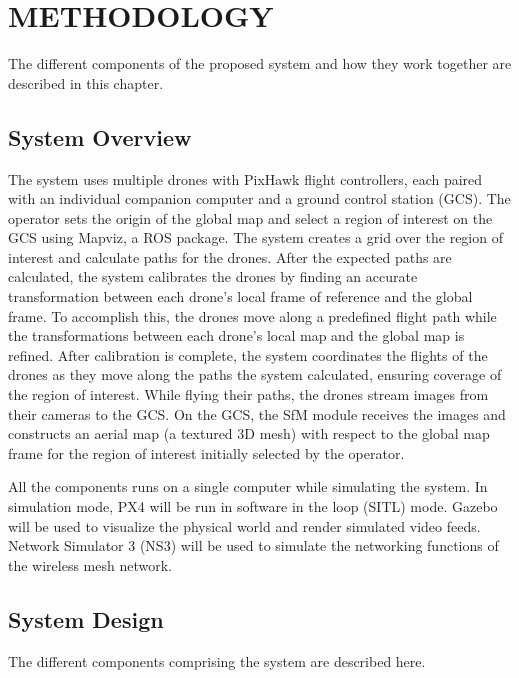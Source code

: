 \setlength{\parindent}{0.5in} 
\setlength{\parskip}{0mm}
\setlength{\baselineskip}{1.6em}

\chapter{METHODOLOGY}
\label{ch:methodology}

The different components of the proposed system and how they work together are described in this chapter.

\section{System Overview}
The system uses multiple drones with PixHawk flight controllers, each paired with an individual companion computer and a ground control station (GCS). The operator sets the origin of the global map and select a region of interest on the GCS using Mapviz, a ROS package. The system creates a grid over the region of interest and calculate paths for the drones. After the expected paths are calculated, the system calibrates the drones by finding an accurate transformation between each drone's local frame of reference and the global frame. To accomplish this, the drones move along a predefined flight path while the transformations between each drone's local map and the global map is refined. After calibration is complete, the system coordinates the flights of the drones as they move along the paths the system calculated, ensuring coverage of the region of interest. While flying their paths, the drones stream images from their cameras to the GCS. On the GCS, the SfM module receives the images and constructs an aerial map (a textured 3D mesh) with respect to the global map frame for the region of interest initially selected by the operator.


All the components runs on a single computer while simulating the system. In simulation mode, PX4 will be run in software in the loop (SITL) mode. Gazebo will be used to visualize the physical world and render simulated video feeds. Network Simulator 3 (NS3) will be used to simulate the networking functions of the wireless mesh network.

\section{System Design}

The different components comprising the system are described here.

